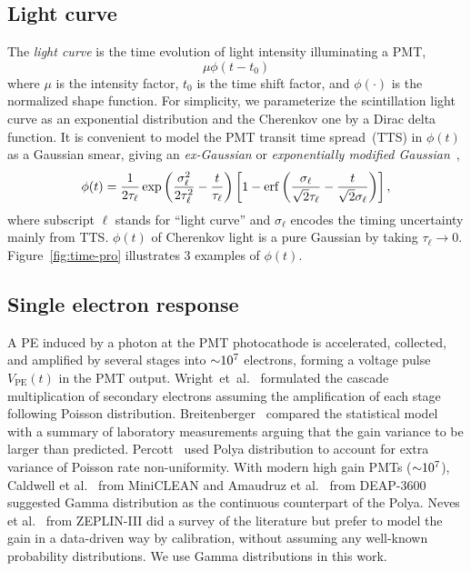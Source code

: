 \subsection{Light curve}
\label{sec:lc}
The \textit{light curve} is the time evolution of light intensity illuminating a PMT,
\begin{equation}
  \label{eq:light-curve}
  \mu\phi(t-t_0)
\end{equation}
where $\mu$ is the intensity factor, $t_0$ is the time shift factor, and $\phi(\cdot)$ is the normalized shape function. For simplicity, we parameterize the scintillation light curve as an exponential distribution and the Cherenkov one by a Dirac delta function.  It is convenient to model the PMT transit time spread~(TTS) in $\phi(t)$ as a Gaussian smear, giving an \textit{ex-Gaussian} or \textit{exponentially modified Gaussian}~\cite{li_separation_2016},
\begin{align}
    \phi(t) = \frac{1}{2\tau_\ell} \exp\left(\frac{\sigma_\ell^2}{2\tau_\ell^2}-\frac{t}{\tau_\ell}\right) \left[1 - \operatorname{erf}\left( \frac{\sigma_\ell}{\sqrt{2}\tau_\ell} - \frac{t}{\sqrt{2}\sigma_\ell} \right)\right],
    \label{eq:time-pro}
\end{align}
where subscript $\ell$ stands for ``light curve'' and $\sigma_\ell$ encodes the timing uncertainty mainly from TTS. $\phi(t)$ of Cherenkov light is a pure Gaussian by taking $\tau_\ell \rightarrow 0$. Figure~\ref{fig:time-pro} illustrates 3 examples of $\phi(t)$. 

\subsection{Single electron response}
\label{subsec:spe}

A PE induced by a photon at the PMT photocathode is accelerated, collected, and amplified by several stages into $\num[retain-unity-mantissa=false]{\sim 1e7}$ electrons, forming a voltage pulse $V_\mathrm{PE}(t)$ in the PMT output.  Wright~et~al.~\cite{wright_low_1954} formulated the cascade multiplication of secondary electrons assuming the amplification of each stage following Poisson distribution.  Breitenberger~\cite{breitenberger_scintillation_1955} compared the statistical model with a summary of laboratory measurements arguing that the gain variance to be larger than predicted. Percott~\cite{prescott_statistical_1966} used Polya distribution to account for extra variance of Poisson rate non-uniformity.  With modern high gain PMTs ($\num[retain-unity-mantissa=false]{\sim 1e7}$), Caldwell et al.~\cite{caldwell_characterization_2013} from MiniCLEAN and Amaudruz et al.~\cite{amaudruz_-situ_2019} from DEAP-3600 suggested Gamma distribution as the continuous counterpart of the Polya.  Neves et al.~\cite{neves_calibration_2010} from ZEPLIN-III did a survey of the literature but prefer to model the gain in a data-driven way by calibration, without assuming any well-known probability distributions.  We use Gamma distributions in this work.

